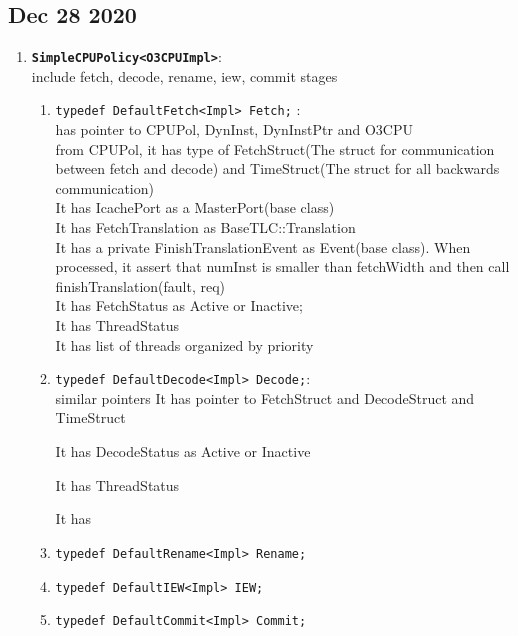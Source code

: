 \documentclass[11pt]{article}
\begin{document}
\subsection{Dec 28 2020}
\begin{enumerate}
	\item \textbf{\texttt{SimpleCPUPolicy<O3CPUImpl>}}:\\
		include fetch, decode, rename, iew, commit stages
		\begin{enumerate}
			\item \texttt{typedef DefaultFetch<Impl> Fetch;}  :\\
			
			has pointer to CPUPol, DynInst, DynInstPtr and O3CPU\\
			
			from CPUPol, it has type of FetchStruct(The struct for communication between fetch and decode) and TimeStruct(The struct for all backwards communication)\\
			
			It has IcachePort as a MasterPort(base class)\\
			
			It has FetchTranslation as BaseTLC::Translation\\
			
			It has a private FinishTranslationEvent as Event(base class). When processed, it assert that numInst is smaller than fetchWidth and then call finishTranslation(fault, req)\\
			
			It has FetchStatus as Active or Inactive; \\
			
			It has ThreadStatus\\
			
			It has list of threads organized by priority
			
		\item \texttt{typedef DefaultDecode<Impl> Decode;}:\\
		
		 similar pointers It has pointer to FetchStruct and DecodeStruct and TimeStruct
		 
		 It has DecodeStatus as Active or Inactive
		 
		 It has ThreadStatus
		 
		 It has 
		
		\item \texttt{typedef DefaultRename<Impl> Rename;}
		
		\item \texttt{typedef DefaultIEW<Impl> IEW;}
		
		\item \texttt{typedef DefaultCommit<Impl> Commit;}
			
		\end{enumerate}
\end{enumerate}
\end{document}
